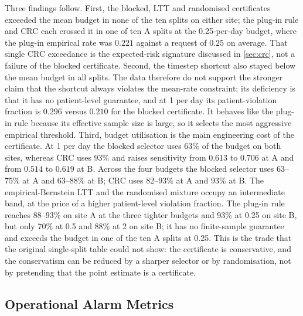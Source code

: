 Three findings follow. First, the blocked, LTT and randomised certificates exceeded the mean budget in none of the ten splits on either site; the plug-in rule and CRC each crossed it in one of ten A splits at the 0.25-per-day budget, where the plug-in empirical rate was $0.221$ against a request of $0.25$ on average. That single CRC exceedance is the expected-risk signature discussed in \cref{sec:crc}, not a failure of the blocked certificate. Second, the timestep shortcut also stayed below the mean budget in all splits. The data therefore do not support the stronger claim that the shortcut always violates the mean-rate constraint; its deficiency is that it has no patient-level guarantee, and at 1 per day its patient-violation fraction is $0.296$ versus $0.210$ for the blocked certificate. It behaves like the plug-in rule because its effective sample size is large, so it selects the most aggressive empirical threshold. Third, budget utilisation is the main engineering cost of the certificate. At 1 per day the blocked selector uses 63\% of the budget on both sites, whereas CRC uses 93\% and raises sensitivity from $0.613$ to $0.706$ at A and from $0.514$ to $0.619$ at B. Across the four budgets the blocked selector uses 63--75\% at A and 63--88\% at B; CRC uses 82--93\% at A and 93\% at B. The empirical-Bernstein LTT and the randomised mixture occupy an intermediate band, at the price of a higher patient-level violation fraction. The plug-in rule reaches 88--93\% on site A at the three tighter budgets and 93\% at 0.25 on site B, but only 70\% at 0.5 and 88\% at 2 on site B; it has no finite-sample guarantee and exceeds the budget in one of the ten A splits at 0.25. This is the trade that the original single-split table could not show: the certificate is conservative, and the conservatism can be reduced by a sharper selector or by randomisation, not by pretending that the point estimate is a certificate.

\subsection{Operational Alarm Metrics}
\label{sec:operational}


